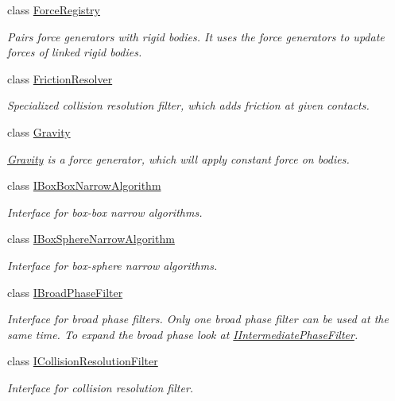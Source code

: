 \begin{DoxyCompactItemize}
class \mbox{\hyperlink{classr3_1_1_force_registry}{Force\+Registry}}
\begin{DoxyCompactList}\small\item\em Pairs force generators with rigid bodies. It uses the force generators to update forces of linked rigid bodies. \end{DoxyCompactList}\item 
class \mbox{\hyperlink{classr3_1_1_friction_resolver}{Friction\+Resolver}}
\begin{DoxyCompactList}\small\item\em Specialized collision resolution filter, which adds friction at given contacts. \end{DoxyCompactList}\item 
class \mbox{\hyperlink{classr3_1_1_gravity}{Gravity}}
\begin{DoxyCompactList}\small\item\em \mbox{\hyperlink{classr3_1_1_gravity}{Gravity}} is a force generator, which will apply constant force on bodies. \end{DoxyCompactList}\item 
class \mbox{\hyperlink{classr3_1_1_i_box_box_narrow_algorithm}{I\+Box\+Box\+Narrow\+Algorithm}}
\begin{DoxyCompactList}\small\item\em Interface for box-\/box narrow algorithms. \end{DoxyCompactList}\item 
class \mbox{\hyperlink{classr3_1_1_i_box_sphere_narrow_algorithm}{I\+Box\+Sphere\+Narrow\+Algorithm}}
\begin{DoxyCompactList}\small\item\em Interface for box-\/sphere narrow algorithms. \end{DoxyCompactList}\item 
class \mbox{\hyperlink{classr3_1_1_i_broad_phase_filter}{I\+Broad\+Phase\+Filter}}
\begin{DoxyCompactList}\small\item\em Interface for broad phase filters. Only one broad phase filter can be used at the same time. To expand the broad phase look at \mbox{\hyperlink{classr3_1_1_i_intermediate_phase_filter}{I\+Intermediate\+Phase\+Filter}}. \end{DoxyCompactList}\item 
class \mbox{\hyperlink{classr3_1_1_i_collision_resolution_filter}{I\+Collision\+Resolution\+Filter}}
\begin{DoxyCompactList}\small\item\em Interface for collision resolution filter. \end{DoxyCompactList}\item 

\end{DoxyCompactItemize}
